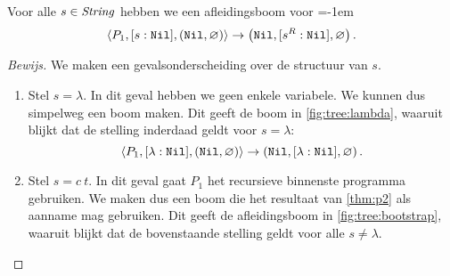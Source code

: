 \begin{thm}
	{
		Voor alle $s\in\mathit{String}$ hebben we een afleidingsboom voor
		\normalfont
		\belowdisplayskip=-1em
		$$
		\left\langle P_1,[s:\texttt{Nil}],(\texttt{Nil},\varnothing)\right\rangle\to\left(\texttt{Nil},[s^R:\texttt{Nil}],\varnothing\right).
		$$
	}
	\label{thm:p1}
	\begin{proof}[Bewijs]
		We maken een gevalsonderscheiding over de structuur van $s$.

		\begin{enumerate}[label={Geval \arabic*.},itemindent=1.5\parindent]
			\item Stel $s=\lambda$. In dit geval hebben we geen enkele variabele. We
				kunnen dus simpelweg een boom maken. Dit geeft de boom in
				\autoref{fig:tree:lambda}, waaruit blijkt dat de stelling inderdaad
				geldt voor $s=\lambda$:
				$$
				\left\langle P_1,[\lambda:\texttt{Nil}],(\texttt{Nil},\varnothing)\right\rangle\to\left(\texttt{Nil},[\lambda:\texttt{Nil}],\varnothing\right).
				$$

			\item Stel $s=c~t$. In dit geval gaat $P_1$ het recursieve binnenste
				programma gebruiken. We maken dus een boom die het resultaat van
				\autoref{thm:p2} als aanname mag gebruiken. Dit geeft de afleidingsboom
				in \autoref{fig:tree:bootstrap}, waaruit blijkt dat de bovenstaande
				stelling geldt voor alle $s\ne\lambda$.
		\end{enumerate}
	\end{proof}
\end{thm}
